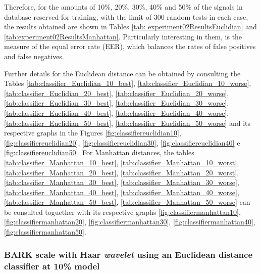 		\par Therefore, for the amounts of 10\%, 20\%, 30\%, 40\% and 50\% of the signals in database reserved for training, with the limit of 300 random tests in each case, the results obtained are shown in Tables \ref{tab: experiment02ResultsEuclidian} and \ref{tab:experiment02ResultsManhattan}. Particularly interesting in them, is the measure of the equal error rate (EER), which balances the rates of false positives and false negatives.
		\\
		
		\par Further details for the Euclidean distance can be obtained by consulting the Tables
		 \ref{tab:classifier_Euclidian_10_best}, \ref{tab:classifier_Euclidian_10_worse},
		\ref{tab:classifier_Euclidian_20_best}, \ref{tab:classifier_Euclidian_20_worse}, 
		\ref{tab:classifier_Euclidian_30_best}, \ref{tab:classifier_Euclidian_30_worse}, 
		\ref{tab:classifier_Euclidian_40_best}, \ref{tab:classifier_Euclidian_40_worse}, 
		\ref{tab:classifier_Euclidian_50_best}, \ref{tab:classifier_Euclidian_50_worse}
		and its respective graphs in the Figures \ref{fig:classifiereuclidian10}, \ref{fig:classifiereuclidian20}, \ref{fig:classifiereuclidian30}, \ref{fig:classifiereuclidian40} e \ref{fig:classifiereuclidian50}. For Manhattan distances, the tables \ref{tab:classifier_Manhattan_10_best}, \ref{tab:classifier_Manhattan_10_worst}, 
		\ref{tab:classifier_Manhattan_20_best}, \ref{tab:classifier_Manhattan_20_worst}, 
		\ref{tab:classifier_Manhattan_30_best}, \ref{tab:classifier_Manhattan_30_worse}, 
		\ref{tab:classifier_Manhattan_40_best}, \ref{tab:classifier_Manhattan_40_worse}, 
		\ref{tab:classifier_Manhattan_50_best}, \ref{tab:classifier_Manhattan_50_worse} 
		can be consulted toguether with its respective graphs \ref{fig:classifiermanhattan10}, \ref{fig:classifiermanhattan20}, \ref{fig:classifiermanhattan30}, \ref{fig:classifiermanhattan40}, \ref{fig:classifiermanhattan50}.\\
		
		

		\subsubsection{BARK scale with Haar \textit{wavelet} using an Euclidean distance classifier at 10\% model}
		
			
			
